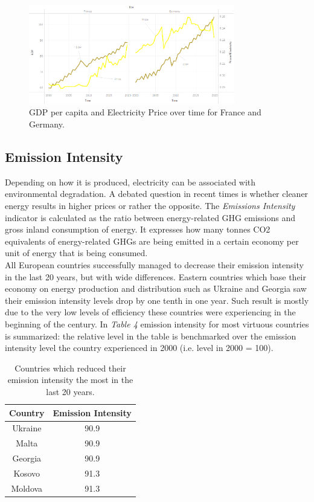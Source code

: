 \documentclass{book}
\begin{document}
\bigskip
\begin{figure}[H]
\begin{center}
\captionsetup{justification=centering}
\includegraphics[width=0.8\textwidth]{Images/pri-gdp.png}
\caption{GDP per capita and Electricity Price over time for France and Germany. }
\end{center}
\end{figure}
\bigskip

\subsection*{Emission Intensity}

Depending on how it is produced, electricity can be associated with environmental degradation. A debated question in recent times is whether cleaner energy results in higher prices or rather the opposite. The \textit{Emissions Intensity} indicator is calculated as the ratio between energy-related GHG emissions and gross inland consumption of energy. It expresses how many tonnes CO2 equivalents of energy-related GHGs are being emitted in a certain economy per unit of energy that is being consumed.\\

All European countries successfully managed to decrease their emission intensity in the last 20 years, but with wide differences. Eastern countries which base their economy on energy production and distribution such as Ukraine and Georgia saw their emission intensity levels drop by one tenth in one year. Such result is mostly due to the very low levels of efficiency these countries were experiencing in the beginning of the century. In \textit{Table 4} emission intensity for most virtuous countries is summarized: the relative level in the table is benchmarked over the emission intensity level the country experienced in 2000 (i.e. level in 2000 = 100).

\bigskip
\begin{table}[H]
\begin{center}
\begin{tabular}{|c|c|}
\hline
Country & Emission Intensity \\
\hline
Ukraine & 90.9\\
Malta & 90.9\\
Georgia & 90.9\\
Kosovo & 91.3\\
Moldova & 91.3\\
\hline
\end{tabular}
\caption{Countries which reduced their emission intensity the most in the last 20 years.}
\end{center}
\end{table}
\bigskip
\end{document}
